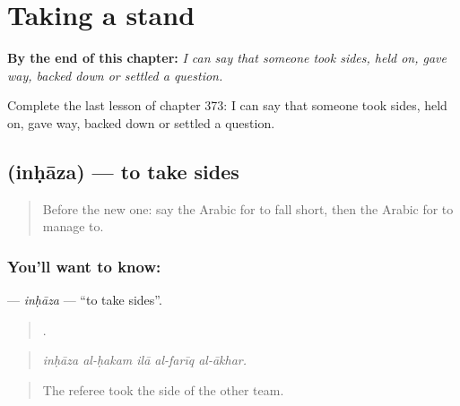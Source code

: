 
\chapter{Taking a stand}
\label{ch:ar-taking-a-stand}

\begin{chapteropening}
\textbf{By the end of this chapter:} \emph{I can say that someone took sides, held on, gave way, backed down or settled a question.}

Complete the last lesson of chapter 373: I can say that someone took sides, held on, gave way, backed down or settled a question.
\end{chapteropening}

\section[\texorpdfstring{\ar{انحاز} (inḥāza)}{انحاز (inḥāza)}]{ (inḥāza) — to take sides}

\label{lesson:AR-C373-inhaza}



\begin{quote}
Before the new one: say the Arabic for to fall short, then the Arabic for to manage to.
\end{quote}

\subsection*{You'll want to know: }
\textbf{} — \emph{inḥāza} — \textquotedblleft{}to take sides\textquotedblright{}.

\begin{quote}
    .
\end{quote}

\begin{quote}
\emph{inḥāza al-ḥakam ilā al-farīq al-ākhar.}
\end{quote}

\begin{quote}
The referee took the side of the other team.
\end{quote}

